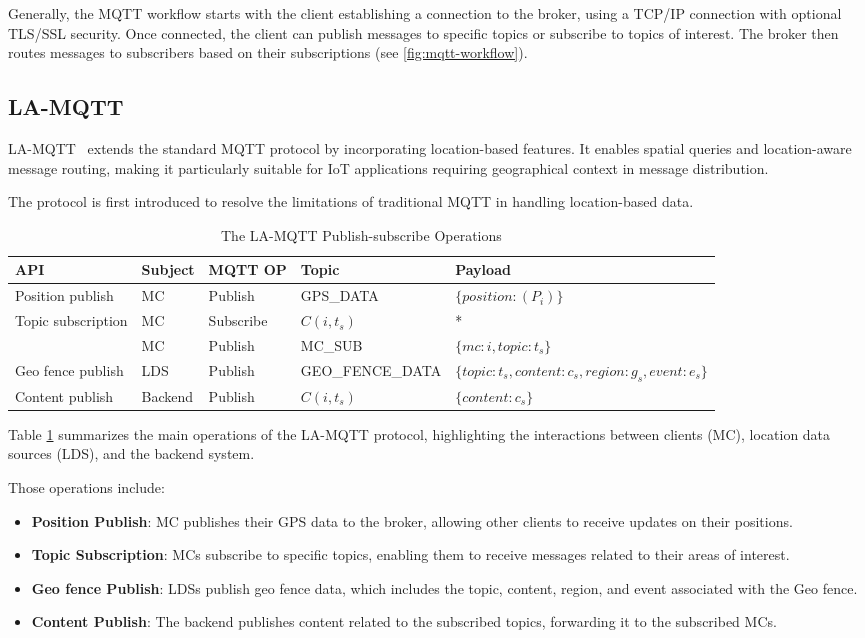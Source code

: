 Generally, the MQTT workflow starts with the client establishing a connection to the broker, using a TCP/IP connection with optional TLS/SSL security. Once connected, the client can publish messages to specific topics or subscribe to topics of interest. The broker then routes messages to subscribers based on their subscriptions (see \cref{fig:mqtt-workflow}).

\subsection{LA-MQTT} \label{sec:la-mqtt}
LA-MQTT~\cite{montori2022lamqtt} extends the standard MQTT protocol by incorporating location-based features. It enables spatial queries and location-aware message routing, making it particularly suitable for IoT applications requiring geographical context in message distribution.

The protocol is first introduced to resolve the limitations of traditional MQTT in handling location-based data.

\begin{table}[h]
\small
\begin{tabularx}{\linewidth}{|l|X|X|X|p{4cm}|}
\hline
\textbf{API} & \textbf{Subject} & \textbf{MQTT OP} & \textbf{Topic} & \textbf{Payload} \\ \hline
Position publish & MC & Publish & GPS\_DATA & $\{position: ( P_i )\}$ \\ \hline
Topic subscription & MC & Subscribe & $C(i, t_s)$ & * \\ \cline{2-5}
 & MC & Publish & MC\_SUB & $\{ mc: i, topic: t_s \}$ \\ \hline
Geo fence publish & LDS & Publish & GEO\_FENCE\_DATA & $\{topic: t_s, content: c_s, $\newline$region: g_s, event: e_s\}$ \\ \hline
Content publish & Backend & Publish & $C(i, t_s)$ & $\{content: c_s\}$ \\ \hline
\end{tabularx}
\caption{The LA-MQTT Publish-subscribe Operations}
\label{table:la-mqtt}
\end{table}

Table \ref{table:la-mqtt} summarizes the main operations of the LA-MQTT protocol, highlighting the interactions between clients (MC), location data sources (LDS), and the backend system.

Those operations include:
\begin{itemize}
    \item \textbf{Position Publish}: MC publishes their GPS data to the broker, allowing other clients to receive updates on their positions.
    \item \textbf{Topic Subscription}: MCs subscribe to specific topics, enabling them to receive messages related to their areas of interest.
    \item \textbf{Geo fence Publish}: LDSs publish geo fence data, which includes the topic, content, region, and event associated with the Geo fence.
    \item \textbf{Content Publish}: The backend publishes content related to the subscribed topics, forwarding it to the subscribed MCs.
\end{itemize}

